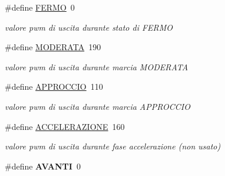 \begin{DoxyCompactItemize}
\mbox{\label{ari_pi__2_d_c__esp__08_8ino_a3ea4f86fda9125c7b34d735b4f14f42a}} 
\#define \mbox{\hyperlink{ari_pi__2_d_c__esp__08_8ino_a3ea4f86fda9125c7b34d735b4f14f42a}{F\+E\+R\+MO}}~0
\begin{DoxyCompactList}\small\item\em valore pwm di uscita durante stato di F\+E\+R\+MO \end{DoxyCompactList}\item 
\mbox{\label{ari_pi__2_d_c__esp__08_8ino_a4774b749cfc65db93b2e726543c9115f}} 
\#define \mbox{\hyperlink{ari_pi__2_d_c__esp__08_8ino_a4774b749cfc65db93b2e726543c9115f}{M\+O\+D\+E\+R\+A\+TA}}~190
\begin{DoxyCompactList}\small\item\em valore pwm di uscita durante marcia M\+O\+D\+E\+R\+A\+TA \end{DoxyCompactList}\item 
\mbox{\label{ari_pi__2_d_c__esp__08_8ino_a3336677c5466ffd6adee69e68e25f236}} 
\#define \mbox{\hyperlink{ari_pi__2_d_c__esp__08_8ino_a3336677c5466ffd6adee69e68e25f236}{A\+P\+P\+R\+O\+C\+C\+IO}}~110
\begin{DoxyCompactList}\small\item\em valore pwm di uscita durante marcia A\+P\+P\+R\+O\+C\+C\+IO \end{DoxyCompactList}\item 
\mbox{\label{ari_pi__2_d_c__esp__08_8ino_a9af1e62ce938e1b51a846fc15cf307e3}} 
\#define \mbox{\hyperlink{ari_pi__2_d_c__esp__08_8ino_a9af1e62ce938e1b51a846fc15cf307e3}{A\+C\+C\+E\+L\+E\+R\+A\+Z\+I\+O\+NE}}~160
\begin{DoxyCompactList}\small\item\em valore pwm di uscita durante fase accelerazione (non usato) \end{DoxyCompactList}\item 
\mbox{\label{ari_pi__2_d_c__esp__08_8ino_a7d6e95bc7ca024893f2bd7d217b2bd6d}} 
\#define {\bfseries A\+V\+A\+N\+TI}~0
\item 
\mbox{\label{ari_pi__2_d_c__esp__08_8ino_a8db0e8841207a8e9ce1845ba10b4a637}} 

\end{DoxyCompactItemize}
